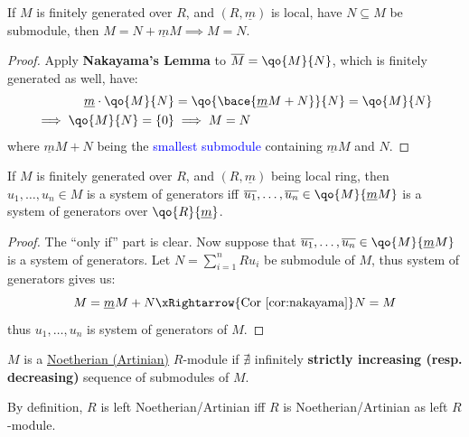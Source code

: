 \begin{corollary}
	\label{cor:nakayama}
	If \( M \) is finitely generated over \( R \), and \( (R,\underline{m}) \) is local, have \( N
	\subseteq M \) be submodule, then \( M = N + \underline{m}M \implies M = N \).
\end{corollary}

\begin{proof}
	Apply \textbf{Nakayama's Lemma} to \(\overline{M} = \qo{M}{N} \), which is finitely generated as
	well, have:
	\[
		\begin{aligned}
			\underline{m} \cdot \qo{M}{N} & = \qo{\bace{\underline{m}M + N}}{N}  = \qo{M}{N} \\
			\implies \qo{M}{N} = \{0\}    & \implies M = N
		\end{aligned}
	\]
	where \( \underline{m} M + N \) being the \textcolor{blue}{smallest submodule} containing \( \underline{m}M \) and
	\( N \).
\end{proof}

\begin{corollary}
	If \( M \) is finitely generated over \( R \), and \( (R, \underline{m}) \) being local ring, then
	\( u_1, \ldots, u_n \in M \) is a system of generators iff \( \overline{u_1}, \ldots,
	\overline{u_n} \in \qo{M}{\underline{m}M}\) is a system of generators over \( \qo{R}{\underline{m}} \).
\end{corollary}

\begin{proof}
	The ``only if'' part is clear. Now suppose that \( \overline{u_1}, \ldots, \overline{u_n} \in
	\qo{M}{\underline{m}M} \) is a system of generators. Let \( N = \sum_{i=1}^n R u_i \) be submodule
	of \( M \), thus system of generators gives us:
	\[
		M = \underline{m} M + N \xRightarrow{\text{Cor \ref{cor:nakayama}}} N = M
	\]
	thus \( u_1, \ldots, u_n \) is system of generators of \( M \).
\end{proof}


\begin{definition}
	\( M \) is a \underline{Noetherian (Artinian)} \( R \)-module if \( \nexists \) infinitely
	\textbf{strictly increasing (resp. decreasing)} sequence of submodules of \( M \).
\end{definition}

\begin{note}
	By definition, \( R \) is left Noetherian/Artinian iff \( R \) is Noetherian/Artinian as left \( R \)-module.
\end{note}

